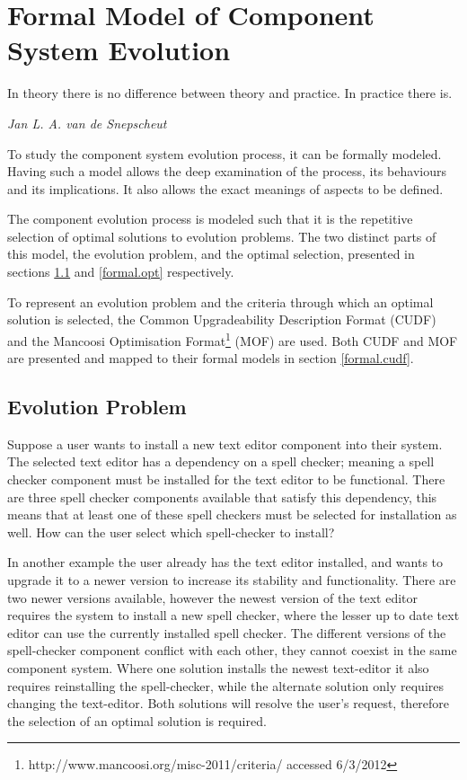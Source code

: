 \chapter{Formal Model of Component System Evolution}
\label{formal}
\epigraph{In theory there is no difference between theory and practice. In practice there is.}
{\textit{Jan L. A. van de Snepscheut}}
To study the component system evolution process, it can be formally modeled.
Having such a model allows the deep examination of the process, its behaviours and its implications.
It also allows the exact meanings of aspects to be defined. 

The component evolution process is modeled such that it is the repetitive selection of optimal solutions to evolution problems.
The two distinct parts of this model, the evolution problem, and the optimal selection,
presented in sections \ref{formal.step} and \ref{formal.opt} respectively.

To represent an evolution problem and the criteria through which an optimal solution is selected,
the Common Upgradeability Description Format (CUDF) \citep{treinen2009common}
and the Mancoosi Optimisation Format\footnote{http://www.mancoosi.org/misc-2011/criteria/ accessed 6/3/2012} (MOF) are used.
Both CUDF and MOF are presented and mapped to their formal models in section \ref{formal.cudf}. 

\section{Evolution Problem}
\label{formal.step}
Suppose a user wants to install a new text editor component into their system.
The selected text editor has a dependency on a spell checker;
meaning a spell checker component must be installed for the text editor to be functional.
There are three spell checker components available that satisfy this dependency,
this means that at least one of these spell checkers must be selected for installation as well.
How can the user select which spell-checker to install? 

In another example the user already has the text editor installed, and wants to upgrade it to a newer version to increase its stability and functionality.
There are two newer versions available, however the newest version of the text editor requires the system to install a new spell checker,
where the lesser up to date text editor can use the currently installed spell checker.
The different versions of the spell-checker component conflict with each other, they cannot coexist in the same component system.
Where one solution installs the newest text-editor it also requires reinstalling the spell-checker, 
while the alternate solution only requires changing the text-editor.
Both solutions will resolve the user's request, therefore the selection of an optimal solution is required.  

